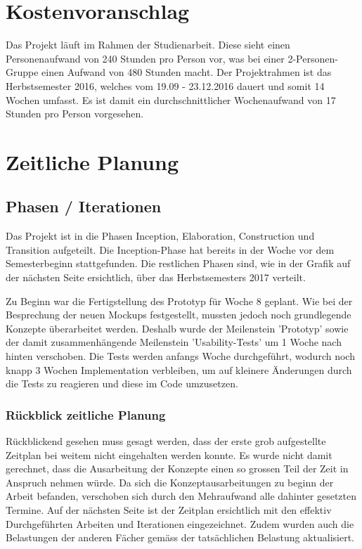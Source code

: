 
 \section{Kostenvoranschlag}
 Das Projekt läuft im Rahmen der Studienarbeit. Diese sieht einen Personenaufwand von 240 Stunden pro Person vor, was bei einer 2-Personen-Gruppe einen Aufwand von 480 Stunden macht. 
 Der Projektrahmen ist das Herbstsemester 2016, welches vom 19.09 - 23.12.2016 dauert und somit 14 Wochen umfasst. Es ist damit ein durchschnittlicher Wochenaufwand von 17 Stunden pro Person vorgesehen.
 
 
 \section{Zeitliche Planung}
 
 \subsection{Phasen / Iterationen}
 Das Projekt ist in die Phasen Inception, Elaboration, Construction und Transition aufgeteilt. Die Inception-Phase hat bereits in der Woche vor dem Semesterbeginn stattgefunden. Die restlichen Phasen sind, wie in der Grafik auf der nächsten Seite ersichtlich, über das Herbstsemesters 2017 verteilt.
 
 Zu Beginn war die Fertigstellung des Prototyp für Woche 8 geplant. Wie bei der Besprechung der neuen Mockups festgestellt, mussten jedoch noch grundlegende Konzepte überarbeitet werden. Deshalb wurde der Meilenstein 'Prototyp' sowie der damit zusammenhängende Meilenstein 'Usability-Tests' um 1 Woche nach hinten verschoben. Die Tests werden anfangs Woche durchgeführt, wodurch noch knapp 3 Wochen Implementation verbleiben, um auf kleinere Änderungen durch die Tests zu reagieren und diese im Code umzusetzen.
 



 
 \subsubsection{Rückblick zeitliche Planung}
 Rückblickend gesehen muss gesagt werden, dass der erste grob aufgestellte Zeitplan bei weitem nicht eingehalten werden konnte. Es wurde nicht damit gerechnet, dass die Ausarbeitung der Konzepte einen so grossen Teil der Zeit in Anspruch nehmen würde. Da sich die Konzeptausarbeitungen zu beginn der Arbeit befanden, verschoben sich durch den Mehraufwand alle dahinter gesetzten Termine. Auf der nächsten Seite ist der Zeitplan ersichtlich mit den effektiv Durchgeführten Arbeiten und Iterationen eingezeichnet. Zudem wurden auch die Belastungen der anderen Fächer gemäss der tatsächlichen Belastung aktualisiert.
 

